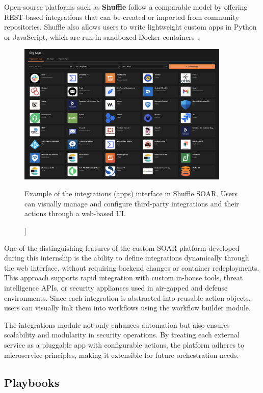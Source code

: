 Open-source platforms such as \textbf{Shuffle} follow a comparable model by offering REST-based integrations that can be created or imported from community repositories. Shuffle also allows users to write lightweight custom apps in Python or JavaScript, which are run in sandboxed Docker containers~\cite{techtarget}.

\begin{figure}[ht]
    \centering
    \includegraphics[width=0.9\textwidth]{images/shuffle_soar_apps.png}
    \caption[[Example of the integrations (apps) interface in Shuffle SOAR]]{Example of the integrations (apps) interface in Shuffle SOAR. Users can visually manage and configure third-party integrations and their actions through a web-based UI.}
    \label{fig:shuffle-soar-apps}
\end{figure}

One of the distinguishing features of the custom SOAR platform developed during this internship is the ability to define integrations dynamically through the web interface, without requiring backend changes or container redeployments. This approach supports rapid integration with custom in-house tools, threat intelligence APIs, or security appliances used in air-gapped and defense environments. Since each integration is abstracted into reusable action objects, users can visually link them into workflows using the workflow builder module.

The integrations module not only enhances automation but also ensures scalability and modularity in security operations. By treating each external service as a pluggable app with configurable actions, the platform adheres to microservice principles, making it extensible for future orchestration needs.

\subsection{Playbooks}

